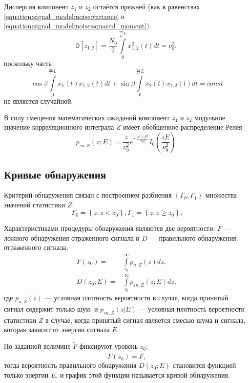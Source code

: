 \documentclass[a4paper,12pt]{article}
\newcommand{\variance}[1]{\mathtt{D} \left [ #1 \right ]}
\begin{document}
    Дисперсия компонент $z_1$ и $z_2$ остаётся прежней (как в равенствах \eqref{equation:signal_model:noise:variance} и \eqref{equation:signal_model:noise:squared_moment}):
    \[
        \variance{z_{1,2}} = \frac{N_0}{2} \int \limits_{0}^{\frac{2 \pi}{\omega}L} x_{1,2}^2(t) dt = \nu_0^2,
    \]
    поскольку часть
    \[
        \cos \beta \int \limits_{0}^{\frac{2 \pi}{\omega}L} x_1(t) x_{1,2}(t) dt + \sin \beta \int \limits_{0}^{\frac{2 \pi}{\omega}L} x_2(t) x_{1,2}(t) dt = const
    \]
    не является случайной.

    В силу смещения математических ожиданий компонент $z_1$ и $z_2$ модульное значение корреляционного интеграла $Z$ имеет обобщенное распределение Релея:
    \begin{equation}
        \label{noise_and_signal:correlation_integral_pdf}
        p_{sn,Z}(z ; E) = \frac{z}{\nu_0^2} e^{- \frac{z^2 + E^2}{2 \nu_0^2}} I_0 \left ( \frac{z E}{\nu_0^2} \right ) .
    \end{equation}

    \subsection{Кривые обнаружения}

    Критерий обнаружения связан с построением разбиения $\left \{ \Gamma_0, \Gamma_1 \right \}$ множества значений статистики $Z$:
    \[
        \Gamma_0 = \left \{ z: z < z_0 \right \} , \Gamma_1 = \left \{ z: z \ge z_0 \right \} .
    \]

    Характеристиками процедуры обнаружения являются две вероятности: $F$ --- ложного обнаружения отраженного сигнала и $D$ --- правильного обнаружения отраженного сигнала,
    \begin{align*}
        F(z_0) = & \int \limits_{z_0}^{\infty} p_{n,Z}(z) dz , \\
        D(z_0; E) = & \int \limits_{z_0}^{\infty} p_{sn,Z}(z ; E) dz ,
    \end{align*}
    где $p_{n,Z}(z)$ --- условная плотность вероятности в случае, когда принятый сигнал содержит только шум, и $p_{sn,Z}(z | E)$ --- условная плотность вероятности
    статистики $Z$ в случае, когда принятый сигнал является смесью шума и сигнала, которая зависит от энергии сигнала $E$.

    По заданной величине $\widetilde{F}$ фиксируют уровень $z_0$:
    \[
        F(z_0) = \widetilde{F},
    \]
    тогда вероятность правильного обнаружения $D(z_0 ; E)$ становится функцией только энергии $E$, и график этой функции называется кривой обнаружения.
\end{document}
